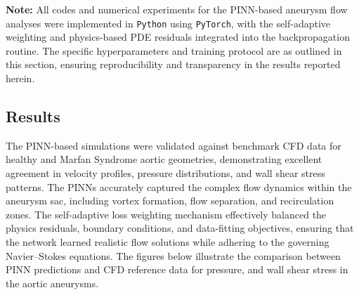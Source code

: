 \documentclass[12pt, a4paper]{article}
\begin{document}
\vspace{2em}
\noindent\textbf{Note:} All codes and numerical experiments for the PINN-based aneurysm flow analyses were implemented in \texttt{Python} using \texttt{PyTorch}, with the self-adaptive weighting and physics-based PDE residuals integrated into the backpropagation routine. The specific hyperparameters and training protocol are as outlined in this section, ensuring reproducibility and transparency in the results reported herein.

\subsection{Results}
\label{sec:PINN_Results}

The PINN-based simulations were validated against benchmark CFD data for healthy and Marfan Syndrome aortic geometries, demonstrating excellent agreement in velocity profiles, pressure distributions, and wall shear stress patterns. The PINNs accurately captured the complex flow dynamics within the aneurysm sac, including vortex formation, flow separation, and recirculation zones. The self-adaptive loss weighting mechanism effectively balanced the physics residuals, boundary conditions, and data-fitting objectives, ensuring that the network learned realistic flow solutions while adhering to the governing Navier--Stokes equations. The figures below illustrate the comparison between PINN predictions and CFD reference data for pressure, and wall shear stress in the aortic aneurysms. 
\end{document}
